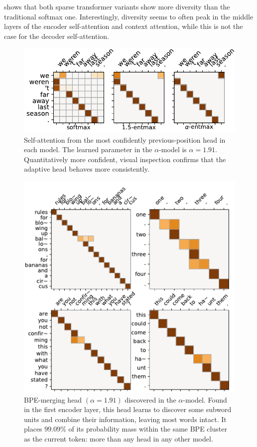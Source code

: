  shows that both sparse transformer variants show
more diversity than the traditional softmax one. Interestingly,
diversity seems to often peak in the middle layers of the encoder
self-attention and context attention, while this is not the case for
the decoder self-attention.

\begin{figure}[htbp]
    \centering
    \includegraphics[width=0.95\columnwidth]{Figures/head_prev.pdf}
    \caption{
        Self-attention from the most confidently previous-position head in
        each model. The learned parameter in the $\alpha$-\entmaxtext model
        is $\alpha=1.91$. Quantitatively more confident, visual inspection
        confirms that the adaptive head behaves more consistently.}
    \label{fig:head_prev}
\end{figure}

\begin{figure}[htbp]
    \centering
    \includegraphics[width=0.95\columnwidth]{Figures/head_bpe}
    \caption{%
        BPE-merging head $(\alpha=1.91)$ discovered in the
        $\alpha$-\entmaxtext model. Found in the first encoder layer,
        this head learns to discover some subword units and combine their
        information, leaving most words intact. It places $99.09\%$ of
        its probability mass within the same BPE cluster as the current
        token: more than any head in any other model.}
    \label{fig:head_bpe}
\end{figure}

